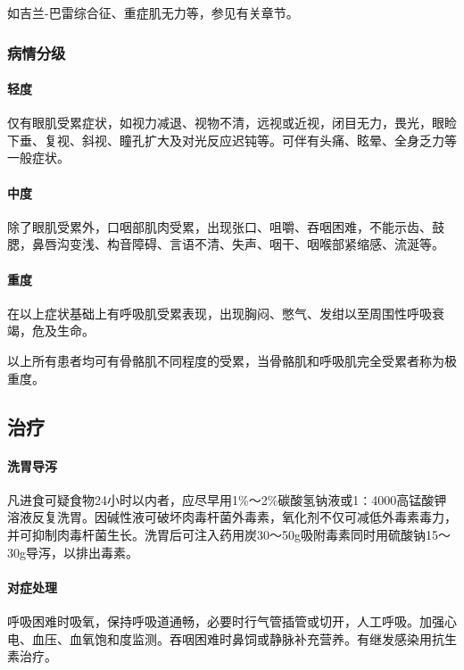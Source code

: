 如吉兰-巴雷综合征、重症肌无力等，参见有关章节。

\subsubsection{病情分级}

\paragraph{轻度}

仅有眼肌受累症状，如视力减退、视物不清，远视或近视，闭目无力，畏光，眼睑下垂、复视、斜视、瞳孔扩大及对光反应迟钝等。可伴有头痛、眩晕、全身乏力等一般症状。

\paragraph{中度}

除了眼肌受累外，口咽部肌肉受累，出现张口、咀嚼、吞咽困难，不能示齿、鼓腮，鼻唇沟变浅、构音障碍、言语不清、失声、咽干、咽喉部紧缩感、流涎等。

\paragraph{重度}

在以上症状基础上有呼吸肌受累表现，出现胸闷、憋气、发绀以至周围性呼吸衰竭，危及生命。

以上所有患者均可有骨骼肌不同程度的受累，当骨骼肌和呼吸肌完全受累者称为极重度。

\subsection{治疗}

\paragraph{洗胃导泻}

凡进食可疑食物24小时以内者，应尽早用1\%～2\%碳酸氢钠液或1∶4000高锰酸钾溶液反复洗胃。因碱性液可破坏肉毒杆菌外毒素，氧化剂不仅可减低外毒素毒力，并可抑制肉毒杆菌生长。洗胃后可注入药用炭30～50g吸附毒素同时用硫酸钠15～30g导泻，以排出毒素。

\paragraph{对症处理}

呼吸困难时吸氧，保持呼吸道通畅，必要时行气管插管或切开，人工呼吸。加强心电、血压、血氧饱和度监测。吞咽困难时鼻饲或静脉补充营养。有继发感染用抗生素治疗。

